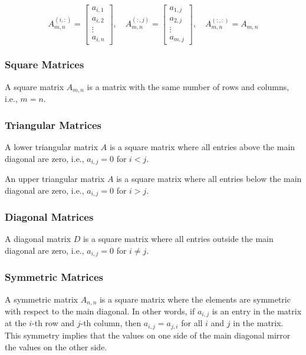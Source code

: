 $$
A_{m,n}^{(i, :)} = \begin{bmatrix}
    a_{i,1}\\
    a_{i, 2}\\
    \vdots\\
    a_{i, n}
\end{bmatrix}, \quad A_{m,n}^{(:, j)} = \begin{bmatrix}
    a_{1,j}\\
    a_{2,j}\\
    \vdots\\
    a_{m,j}
\end{bmatrix}, \quad  A_{m,n}^{(:, :)} = A_{m,n}
$$


\subsubsection{Square Matrices}

A square matrix $A_{m,n}$ is a matrix with the same number of rows and columns, i.e., $m = n$.

\subsubsection{Triangular Matrices}
A lower triangular matrix $A$ is a square matrix where all entries above the main diagonal are zero, i.e., $a_{i,j} = 0$ for $i < j$.

An upper triangular matrix $A$ is a square matrix where all entries below the main diagonal are zero, i.e., $a_{i,j} = 0$ for $i > j$.

\subsubsection{Diagonal Matrices}

A diagonal matrix $D$ is a square matrix where all entries outside the main diagonal are zero, i.e., $a_{i,j} = 0$ for $i \neq j$.

\subsubsection{Symmetric Matrices}
A symmetric matrix $A_{n,n}$ is a square matrix where the elements are symmetric with respect to the main diagonal. 
In other words, if $a_{i,j}$ is an entry in the matrix at the $i$-th row and $j$-th column, then $a_{i,j} = a_{j,i}$ 
for all $i$ and $j$ in the matrix. This symmetry implies that the values on one side of the main diagonal mirror the 
values on the other side.

